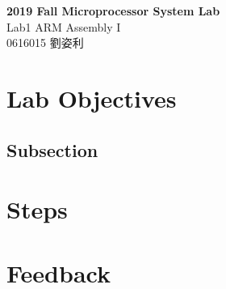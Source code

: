 \documentclass[12pt, a4paper]{article}
\title{
    \textbf{Report Title} \\
    \large Report Subtitle \\
    \small Tracy Liu
    \author Tracy Liu
    \date{}
}
\begin{document}
    \begin{CJK*}{UTF8}{bsmi}

    \begin{center}
        \LARGE\textbf{2019 Fall Microprocessor System Lab} \\
        \large Lab1 ARM Assembly I \\
        \small 0616015 劉姿利 \\
    \end{center}


    \section{Lab Objectives}
        \subsection{Subsection}
    \section{Steps}
    \section{Feedback}

    \end{CJK*}
\end{document}
